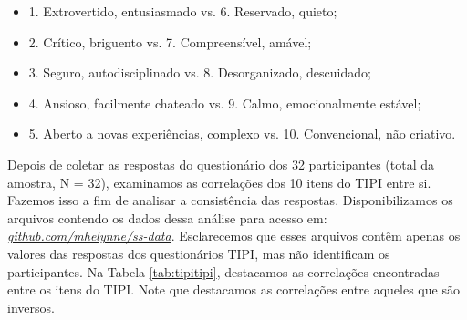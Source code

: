 \begin{itemize}
\item 1. Extrovertido, entusiasmado vs. 6. Reservado, quieto;
\item 2. Crítico, briguento vs. 7. Compreensível, amável;
\item 3. Seguro, autodisciplinado vs. 8. Desorganizado, descuidado;
\item 4. Ansioso, facilmente chateado vs. 9. Calmo, emocionalmente estável;
\item 5. Aberto a novas experiências, complexo vs. 10. Convencional, não criativo.
\end{itemize}

Depois de coletar as respostas do questionário dos 32 participantes (total da amostra, N = 32),
examinamos as correlações dos 10 itens do TIPI entre si.
Fazemos isso a fim de analisar a consistência das respostas.
Disponibilizamos os arquivos contendo os dados dessa análise para acesso em:
\href{https://github.com/mhelynne/ss-data}{\textit{github.com/mhelynne/ss-data}}.
Esclarecemos que esses arquivos contêm apenas os valores das respostas dos questionários TIPI, mas não identificam os participantes.
Na Tabela \ref{tab:tipitipi}, destacamos as correlações encontradas entre os itens do TIPI.
Note que destacamos as correlações entre aqueles que são inversos. 

